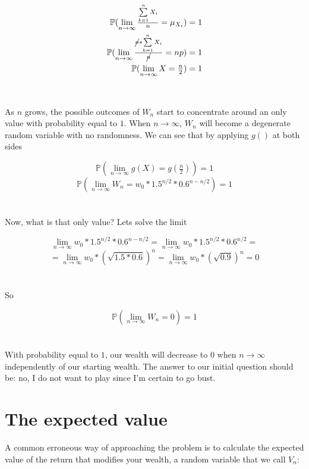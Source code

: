 \documentclass[12pt]{article}
\begin{document}
\begin{align}
    \mathbb{P}(\lim_{n\to\infty} \tfrac{\sum\limits_{k=1}^{n} X_i}{n} = \mu_{X_i}) = 1\\
    \mathbb{P}(\lim_{n\to\infty} \tfrac{\cancel{n}*\sum\limits_{k=1}^{n} X_i}{\cancel{n}} = np) = 1\\
    \mathbb{P}(\lim_{n\to\infty} X = \tfrac{n}{2}) = 1
\end{align}
\\\\
As $n$ grows, the possible outcomes of $W_n$ start to concentrate around an only value with probability equal to $1$. When $n \rightarrow \infty$, $W_n$ will become a degenerate random variable with no randomness. We can see that by applying $g()$ at both sides

\begin{equation*}
    \mathbb{P}(\lim_{n\to\infty} g(X) = g(\tfrac{n}{2})) = 1
\end{equation*}
\begin{equation*}
    \mathbb{P}(\lim_{n\to\infty} W_n = w_0 * 1.5^{n/2} * 0.6^{n-n/2}) = 1
\end{equation*}
\\\\
Now, what is that only value? Lets solve the limit

\begin{equation*}
  \lim_{n\to\infty} w_0 * 1.5^{n/2} * 0.6^{n-n/2} = \lim_{n\to\infty}w_0 * 1.5^{n/2} * 0.6^{n/2} =
\end{equation*}
\begin{equation*}
    = \lim_{n\to\infty}w_0 * (\sqrt{1.5*0.6})^{n} = \lim_{n\to\infty}w_0 * (\sqrt{0.9}) ^{n} = 0
\end{equation*}
\\\\
So

\begin{equation*}
    \mathbb{P}(\lim_{n\to\infty} W_n = 0) = 1
\end{equation*}
\\\\
With probability equal to $1$, our wealth will decrease to 0 when $n\to\infty$ independently of our starting wealth. The answer to our initial question should be: no, I do not want to play since I'm certain to go bust.

\section{The expected value}
A common erroneous way of approaching the problem is to calculate the expected value of the return that modifies your wealth, a random variable that we call $V_n$:
\end{document}
